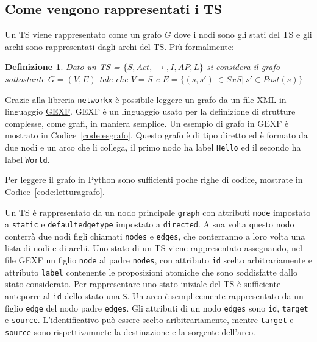 \documentclass[a4paper, 10pt]{article}
\newtheorem{defn}{Definizione}
\numberwithin{equation}{theor}
\begin{document}
\subsection{Come vengono rappresentati i \ac{TS}}
Un \acf{TS} viene rappresentato come un grafo $G$ dove i nodi sono gli stati del \ac{TS} e gli archi sono rappresentati dagli archi del \ac{TS}. Più formalmente:
\begin{defn}
Dato un \acf{TS} = $\{S, Act, \rightarrow, I, AP, L\}$ si considera il grafo sottostante $G = (V,E)$ tale che $V = S$ e $E = \{ (s, s')\ \in S x S|\ s' \in Post(s)\}$
\end{defn}
Grazie alla libreria \href{https://networkx.github.io}{\texttt{networkx}} è possibile leggere un grafo da un file \ac{XML} in linguaggio \href{https://gephi.org/gexf/format/}{\ac{GEXF}}.
\ac{GEXF} è un linguaggio usato per la definizione di strutture complesse, come grafi, in maniera semplice. Un esempio di grafo in \ac{GEXF} è mostrato in Codice~\ref{code:esgrafo}. Questo grafo è di tipo diretto ed è formato da due nodi e un arco che li collega, il primo nodo ha label \texttt{Hello} ed il secondo ha label \texttt{World}.



Per leggere il grafo in Python sono sufficienti poche righe di codice, mostrate in Codice~\ref{code:letturagrafo}.

\par
Un \ac{TS} è rappresentato da un nodo principale \texttt{graph} con attributi \texttt{mode} impostato a \texttt{static} e \texttt{defaultedgetype} impostato a \texttt{directed}. A sua volta questo nodo conterrà due nodi figli chiamati \texttt{nodes} e \texttt{edges}, che conterranno a loro volta una lista di nodi e di archi.
Uno stato di un \ac{TS} viene rappresentato assegnando, nel file \ac{GEXF} un figlio \texttt{node} al padre \texttt{nodes}, con attributo \texttt{id} scelto arbitrariamente e attributo \texttt{label} contenente le proposizioni atomiche che sono soddisfatte dallo stato considerato. Per rappresentare uno stato iniziale del \ac{TS} è sufficiente anteporre al \texttt{id} dello stato una \texttt{S}.
Un arco è semplicemente rappresentato da un figlio \texttt{edge} del nodo padre \texttt{edges}. Gli attributi di un nodo \texttt{edges} sono \texttt{id}, \texttt{target} e \texttt{source}. L'identificativo può essere scelto aribitrariamente, mentre \texttt{target} e \texttt{source} sono rispettivamnete la destinazione e la sorgente dell'arco.
\end{document}
